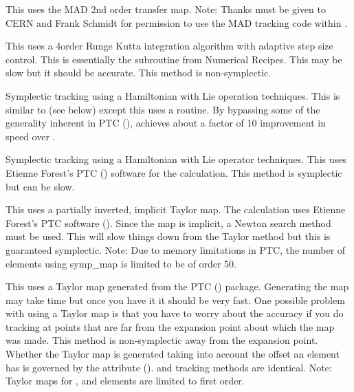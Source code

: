 \begin{description}
\item[\vn{MAD}]
This uses the MAD 2nd order transfer map. Note: Thanks must be given
to CERN and Frank Schmidt for permission to use the MAD tracking code
within \bmad.

\item[\vn{runge_kutta}]
This uses a 4\Th order Runge Kutta integration algorithm with adaptive
step size control.  This is essentially the  subroutine
from Numerical Recipes\cite{b:nr}. This may be slow but it should be
accurate. This method is non-symplectic.

\item[\vn{Symp_Lie_Bmad}]
Symplectic tracking using a Hamiltonian with Lie operation techniques.
This is similar to  (see below) except this uses a
\bmad routine. By bypassing some of the generality inherent in PTC (),
 achieves about a factor of 10 improvement in speed over
.

\item[\vn{Symp_Lie_PTC}]
Symplectic tracking using a Hamiltonian with Lie operator techniques.
This uses Etienne Forest's PTC () software for the
calculation. This method is symplectic but can be slow.

\item[\vn{Symp_Map}]
This uses a partially inverted, implicit Taylor map. The calculation
uses Etienne Forest's PTC software ().  Since the map is implicit, a Newton
search method must be used. This will slow things down from the Taylor
method but this is guaranteed symplectic. Note: Due to memory limitations
in PTC, the number of elements using symp_map is limited to be of order 50.

\item[\vn{Taylor}]
This uses a Taylor map generated from the PTC ()
package. Generating the map may take time but once you have it it
should be very fast. One possible problem with using a Taylor map is
that you have to worry about the accuracy if you do tracking at points
that are far from the expansion point about which the map was
made. This method is non-symplectic away from the expansion
point. Whether the Taylor map is generated taking into account the
offset an element has is governed by the 
attribute ().  and 
tracking methods are identical. Note: Taylor maps for , and
 elements are limited to first order.


\end{description}
